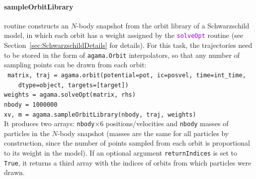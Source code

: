 \documentclass[12pt]{article}
\newcommand{\ttt}[1]{\textcolor{darkviolet}{\texttt{#1}}}
\let\oldparagraph\paragraph
\renewcommand{\paragraph}[1]{\vspace{-2mm}\oldparagraph{#1}}
\begin{document}
\paragraph{sampleOrbitLibrary} routine constructs an $N$-body snapshot from the orbit library of a Schwarzschild model, in which each orbit has a weight assigned by the \ttt{solveOpt} routine (see Section~\ref{sec:SchwarzschildDetails} for details). For this task, the trajectories need to be stored in the form of \texttt{agama.Orbit} interpolators, so that any number of sampling points can be drawn from each orbit:\\[1mm]
\texttt{
matrix, traj = agama.orbit(potential=pot, ic=posvel, time=int_time, \\
\mbox{}~~~~dtype=object, targets=[target])\\
weights = agama.solveOpt(matrix, rhs)\\
nbody = 1000000\\
xv, m = agama.sampleOrbitLibrary(nbody, traj, weights)}\\[2mm]
It produces two arrays: \texttt{nbody}$\times6$ positions/velocities and \texttt{nbody} masses of particles in the $N$-body snapshot (masses are the same for all particles by construction, since the number of points sampled from each orbit is proportional to its weight in the model). If an optional argument \texttt{returnIndices} is set to \texttt{True}, it returns a third array with the indices of orbits from which particles were drawn.
\end{document}
